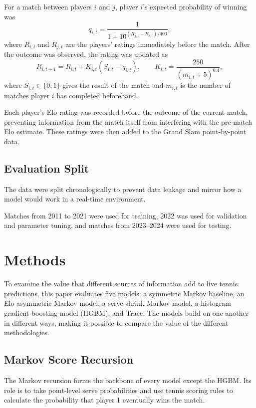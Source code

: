 \documentclass[10pt,twocolumn]{article}
\begin{document}
For a match between players $i$ and $j$, player $i$'s expected probability of winning was
\begin{equation}
q_{i,t}=\frac{1}{1+10^{(R_{j,t}-R_{i,t})/400}},
\end{equation}
where $R_{i,t}$ and $R_{j,t}$ are the players' ratings immediately before the match. After the outcome was observed, the rating was updated as
\begin{equation}
R_{i,t+1}=R_{i,t}+K_{i,t}(S_{i,t}-q_{i,t}),
\qquad
K_{i,t}=\frac{250}{(m_{i,t}+5)^{0.4}},
\end{equation}
where $S_{i,t}\in\{0,1\}$ gives the result of the match and $m_{i,t}$ is the number of matches player $i$ has completed beforehand.

Each player's Elo rating was recorded before the outcome of the current match, preventing information from the match itself from interfering with the pre-match Elo estimate. These ratings were then added to the Grand Slam point-by-point data.

\subsection{Evaluation Split}

The data were split chronologically to prevent data leakage and mirror how a model would work in a real-time environment.

Matches from 2011 to 2021 were used for training, 2022 was used for validation and parameter tuning, and matches from 2023--2024 were used for testing.

\section{Methods}

To examine the value that different sources of information add to live tennis predictions, this paper evaluates five models: a symmetric Markov baseline, an Elo-asymmetric Markov model, a serve-shrink Markov model, a histogram gradient-boosting model (HGBM), and Trace. The models build on one another in different ways, making it possible to compare the value of the different methodologies.

\subsection{Markov Score Recursion}

The Markov recursion forms the backbone of every model except the HGBM. Its role is to take point-level serve probabilities and use tennis scoring rules to calculate the probability that player 1 eventually wins the match.
\end{document}
